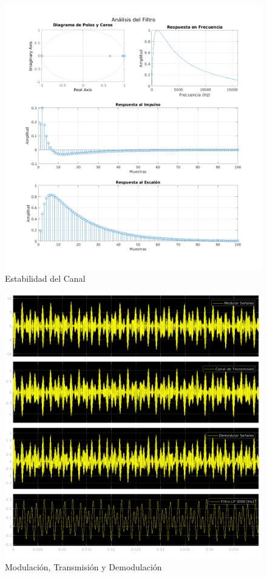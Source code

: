 \begin{figure}[!htb]
  \centering
  \includegraphics[width=\linewidth]{images/simulacion/reducido/chan.png}
  \caption{Estabilidad del Canal}
  \label{fig:real_chan}
\end{figure}



\begin{figure}[!htb]
  \centering
  \includegraphics[width=\linewidth]{images/simulacion/reducido/modem.png}
  \caption{Modulación, Transmisión y Demodulación}
  \label{fig:real_modem}
\end{figure}

